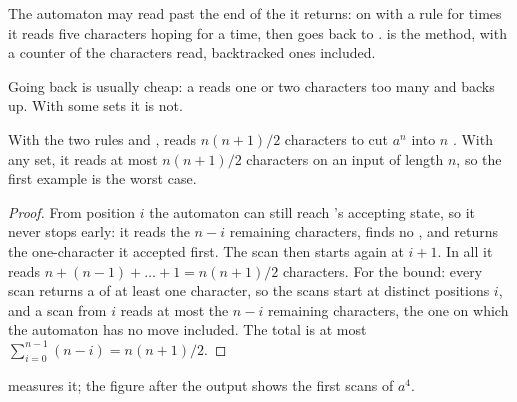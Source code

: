 The automaton may read past the end of the  it returns: on  with a rule for times \code{[0-9][0-9]:[0-9][0-9]} it reads five characters hoping for a time, then goes back to .  is the method, with a counter of the characters read, backtracked ones included.

\label{lst:b3:lexical-analysis:longest}

Going back is usually cheap: a  reads one or two characters too many and backs up. With some  sets it is not.

\begin{proposition}\label{prop:b3:lexical-analysis:quadratic}
With the two rules  and ,  reads $n(n+1)/2$ characters to cut $a^n$ into $n$ . With any  set, it reads at most $n(n+1)/2$ characters on an input of length $n$, so the first example is the worst case.
\end{proposition}

\begin{proof}
From position $i$ the automaton can still reach 's accepting state, so it never stops early: it reads the $n - i$ remaining characters, finds no , and returns the one-character   it accepted first. The scan then starts again at $i + 1$. In all it reads $n + (n-1) + \dots + 1 = n(n+1)/2$ characters. For the bound: every scan returns a  of at least one character, so the scans start at distinct positions $i$, and a scan from $i$ reads at most the $n - i$ remaining characters, the one on which the automaton has no move included. The total is at most $\sum_{i=0}^{n-1}(n - i) = n(n+1)/2$.
\end{proof}

 measures it; the figure after the output shows the first scans of $a^4$.

\label{lst:b3:lexical-analysis:munch}
\label{out:b3:lexical-analysis:munch}

